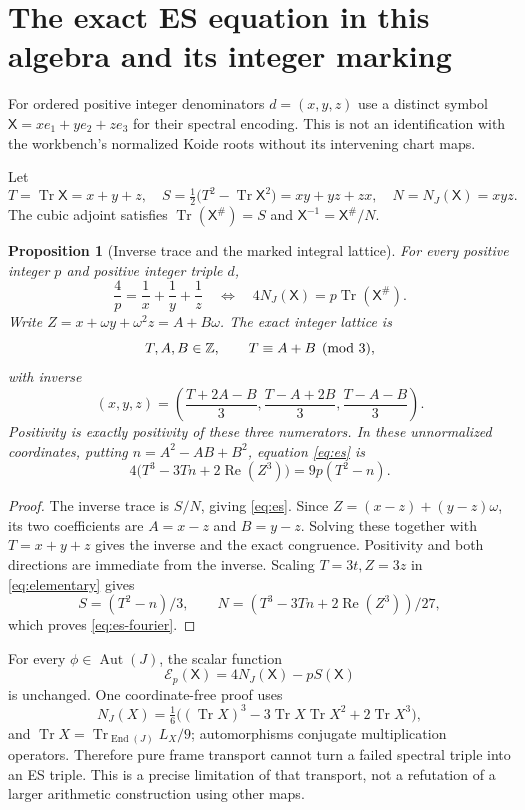 \documentclass[11pt]{article}
\newtheorem{proposition}[theorem]{Proposition}
\theoremstyle{definition}\newtheorem{definition}[theorem]{Definition}
\DeclareMathOperator{\Tr}{Tr}\DeclareMathOperator{\Rea}{Re}
\DeclareMathOperator{\Aut}{Aut}\DeclareMathOperator{\Spin}{Spin}
\begin{document}
\section{The exact ES equation in this algebra and its integer marking}
For ordered positive integer denominators $d=(x,y,z)$ use a distinct symbol $\mathsf X=x e_1+y e_2+z e_3$ for their spectral encoding. This is not an identification with the workbench's normalized Koide roots without its intervening chart maps.

Let
\[
 T=\Tr\mathsf X=x+y+z,\quad
 S=\tfrac12\big(T^2-\Tr\mathsf X^2\big)=xy+yz+zx,\quad
 N=N_J(\mathsf X)=xyz.
\]
The cubic adjoint satisfies $\Tr(\mathsf X^\#)=S$ and $\mathsf X^{-1}=\mathsf X^\#/N$.

\begin{proposition}[Inverse trace and the marked integral lattice]
For every positive integer $p$ and positive integer triple $d$,
\begin{equation}\label{eq:es}
 \frac4p=\frac1x+\frac1y+\frac1z
 \quad\Longleftrightarrow\quad
 4N_J(\mathsf X)=p\Tr(\mathsf X^\#).
\end{equation}
Write $Z=x+\omega y+\omega^2z=A+B\omega$. The exact integer lattice is
\begin{equation}\label{eq:lattice}
 T,A,B\in\mathbb Z,\qquad T\equiv A+B\pmod3,
\end{equation}
with inverse
\[
 (x,y,z)=\left(\frac{T+2A-B}{3},\frac{T-A+2B}{3},\frac{T-A-B}{3}\right).
\]
Positivity is exactly positivity of these three numerators. In these unnormalized coordinates, putting $n=A^2-AB+B^2$, equation \eqref{eq:es} is
\begin{equation}\label{eq:es-fourier}
 4\big(T^3-3Tn+2\Rea(Z^3)\big)=9p(T^2-n).
\end{equation}
\end{proposition}
\begin{proof}
The inverse trace is $S/N$, giving \eqref{eq:es}. Since $Z=(x-z)+(y-z)\omega$, its two coefficients are $A=x-z$ and $B=y-z$. Solving these together with $T=x+y+z$ gives the inverse and the exact congruence. Positivity and both directions are immediate from the inverse. Scaling $T=3t,Z=3z$ in \eqref{eq:elementary} gives
\[
 S=(T^2-n)/3,\qquad
 N=(T^3-3Tn+2\Rea(Z^3))/27,
\]
which proves \eqref{eq:es-fourier}.
\end{proof}

For every $\phi\in\Aut(J)$, the scalar function
\[
 \mathcal E_p(\mathsf X)=4N_J(\mathsf X)-pS(\mathsf X)
\]
is unchanged. One coordinate-free proof uses
\[
 N_J(X)=\tfrac16\big((\Tr X)^3-3\Tr X\Tr X^2+2\Tr X^3\big),
\]
and $\Tr X=\Tr_{\operatorname{End}(J)}L_X/9$; automorphisms conjugate multiplication operators. Therefore pure frame transport cannot turn a failed spectral triple into an ES triple. This is a precise limitation of that transport, not a refutation of a larger arithmetic construction using other maps.
\end{document}
